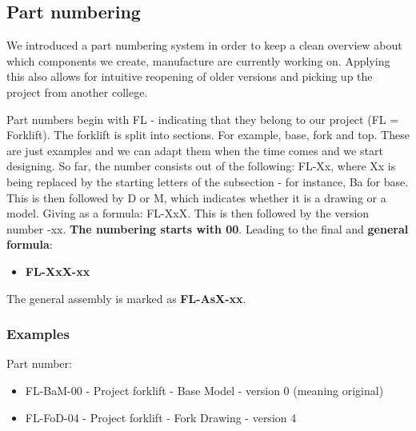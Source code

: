 \documentclass[../report.tex]{subfiles}
\begin{document}
    
    \subsection{Part numbering}
    We introduced a part numbering system in order to keep a clean overview about
    which components we create, manufacture are currently working on. Applying this 
    also allows for intuitive reopening of older versions and picking up the project
    from another college.

    Part numbers begin with FL - indicating that they belong to our project (FL = Forklift). 
    The forklift is split into sections. For example, base, fork and top. These are just
    examples and we can adapt them when the time comes and we start designing.
    So far, the number consists out of the following: FL-Xx, where Xx is being replaced by the starting
    letters of the subsection - for instance, Ba for base. This is then followed by D or M, which indicates
    whether it is a drawing or a model. Giving as a formula:
    FL-XxX. This is then followed by the version number -xx. \textbf{The numbering starts with 00}. Leading to the final 
    and \textbf{general formula}:

    \begin{itemize}
        \item \textbf{FL-XxX-xx}
    \end{itemize}

    The general assembly is marked as \textbf{FL-AsX-xx}.

    \subsubsection{Examples}
    Part number: 
    \begin{itemize}
        \item FL-BaM-00 - Project forklift - Base Model - version 0 (meaning original)
        \item FL-FoD-04 - Project forklift - Fork Drawing - version 4
    \end{itemize}
\end{document}
